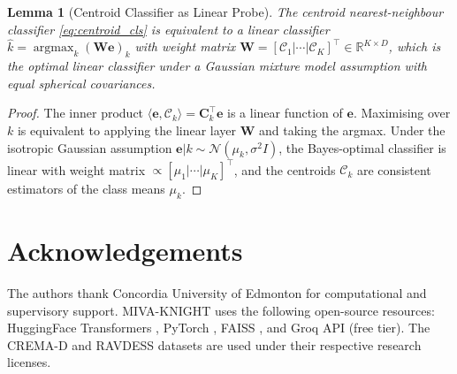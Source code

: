 \documentclass[10pt,conference]{IEEEtran}
\theoremstyle{ieeethm}
\newtheorem{lemma}[theorem]{Lemma}
\theoremstyle{ieeedef}
\theoremstyle{ieeeremark}
\begin{document}
\begin{lemma}[Centroid Classifier as Linear Probe]
\label{lem:centroid_linear}
The centroid nearest-neighbour classifier \eqref{eq:centroid_cls} is equivalent to a linear classifier $\hat{k} = \operatorname{argmax}_k (\mathbf{W}\mathbf{e})_k$ with weight matrix $\mathbf{W} = [\mathcal{C}_1 | \cdots | \mathcal{C}_K]^\top \in \mathbb{R}^{K \times D}$, which is the optimal linear classifier under a Gaussian mixture model assumption with equal spherical covariances.
\end{lemma}
\begin{proof}
The inner product $\langle\mathbf{e}, \mathcal{C}_k\rangle = \mathbf{C}_k^\top\mathbf{e}$ is a linear function of $\mathbf{e}$. Maximising over $k$ is equivalent to applying the linear layer $\mathbf{W}$ and taking the argmax. Under the isotropic Gaussian assumption $\mathbf{e} | k \sim \mathcal{N}(\mu_k, \sigma^2 I)$, the Bayes-optimal classifier is linear with weight matrix $\propto [\mu_1|\cdots|\mu_K]^\top$, and the centroids $\mathcal{C}_k$ are consistent estimators of the class means $\mu_k$.
\end{proof}

\section*{Acknowledgements}
The authors thank Concordia University of Edmonton for computational and supervisory support. MIVA-KNIGHT uses the following open-source resources: HuggingFace Transformers \cite{wolf2020transformers}, PyTorch \cite{paszke2019pytorch}, FAISS \cite{johnson2019billion}, and Groq API (free tier). The CREMA-D and RAVDESS datasets are used under their respective research licenses.
\end{document}
